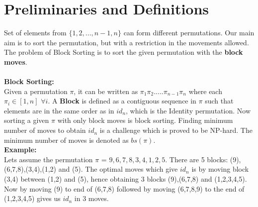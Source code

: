 \documentclass[BTech]{iitmdiss}
\begin{document}
\section{Preliminaries and Definitions}
Set of elements from $\{1,2,...,n-1,n\}$ can form different permutations. Our main aim is to sort the permutation, but with a restriction in the movements allowed. The problem of Block Sorting is to sort the given permutation with the \textbf{block moves}.\\~\\
\textbf{Block Sorting:}\\
Given a permutation $\pi$, it can be written as $\pi_1\pi_2.....\pi_{n-1}\pi_{n}$ where each $\pi_i \in [1,n]$ $\forall i$. A \textbf{Block} is defined as a contiguous sequence in $\pi$ such that elements are in the same order as in $id_n$, which is the Identity permutation. Now sorting a given $\pi$ with only block moves is block sorting. Finding minimum number of moves to obtain $id_n$ is a challenge which is proved to be NP-hard. The minimum number of moves is denoted as $bs(\pi)$.\\
\textbf{Example:}\\
Lets assume the permutation $\pi$ = $9,6,7,8,3,4,1,2,5.$ There are 5 blocks: (9),(6,7,8),(3,4),(1,2) and (5). The optimal moves which give $id_n$ is by moving block (3,4) between (1,2) and (5), hence obtaining 3 blocks (9),(6,7,8) and (1,2,3,4,5). Now by moving (9) to end of (6,7,8) followed by moving (6,7,8,9) to the end of (1,2,3,4,5) gives us $id_n$ in 3 moves.\\~\\
\end{document}
